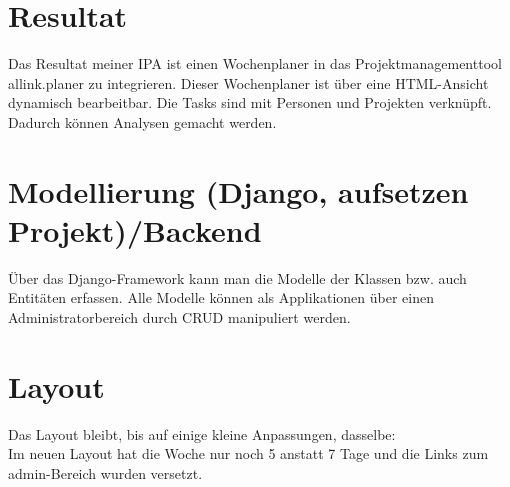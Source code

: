 \section{Resultat}
Das Resultat meiner IPA ist einen Wochenplaner in das Projektmanagementtool allink.planer zu integrieren.
Dieser Wochenplaner ist über eine HTML-Ansicht dynamisch bearbeitbar. Die Tasks sind mit Personen und Projekten verknüpft. Dadurch können Analysen gemacht werden.
\section{Modellierung (Django, aufsetzen Projekt)/Backend }
Über das Django-Framework kann man die Modelle der Klassen bzw. auch Entitäten erfassen.
Alle Modelle können als Applikationen über einen Administratorbereich durch CRUD manipuliert werden.
\section{Layout}
Das Layout bleibt, bis auf einige kleine Anpassungen, dasselbe:\\
Im neuen Layout hat die Woche nur noch 5 anstatt 7 Tage und die Links zum admin-Bereich wurden versetzt.
